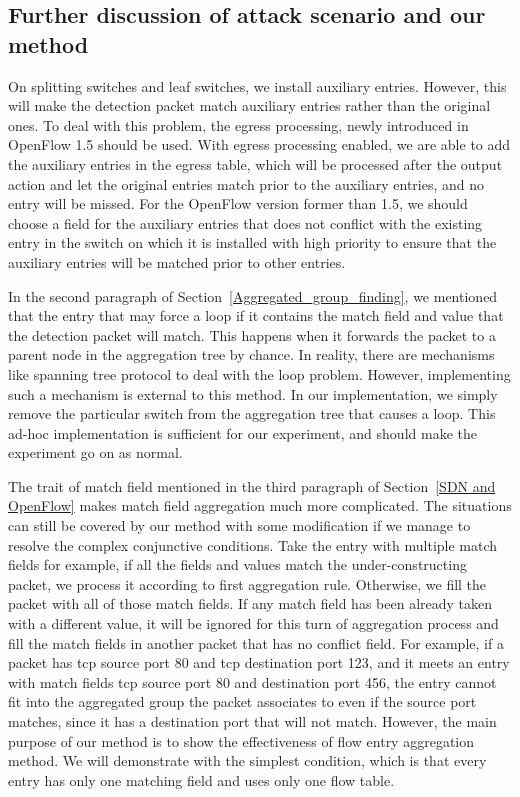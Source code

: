 \subsection{Further discussion of attack scenario and our method}
\label{Further_discussion}
On splitting switches and leaf switches, we install auxiliary entries. However, this will make the detection packet match auxiliary entries rather than the original ones. To deal with this problem, the egress processing, newly introduced in OpenFlow 1.5 \cite{OF_SPEC_15} should be used. With egress processing enabled, we are able to add the auxiliary entries in the egress table, which will be processed after the output action and let the original entries match prior to the auxiliary entries, and no entry will be missed. For the OpenFlow version former than 1.5, we should choose a field for the auxiliary entries that does not conflict with the existing entry in the switch on which it is installed with high priority to ensure that the auxiliary entries will be matched prior to other entries.

In the second paragraph of Section~\ref{Aggregated_group_finding}, we mentioned that the entry that may force a loop if it contains the match field and value that the detection packet will match. This happens when it forwards the packet to a parent node in the aggregation tree by chance. In reality, there are mechanisms like spanning tree protocol to deal with the loop problem. However, implementing such a mechanism is external to this method. In our implementation, we simply remove the particular switch from the aggregation tree that causes a loop. This ad-hoc implementation is sufficient for our experiment, and should make the experiment go on as normal.

The trait of match field mentioned in the third paragraph of Section~\ref{SDN and OpenFlow} makes match field aggregation much more complicated. The situations can still be covered by our method with some modification if we manage to resolve the complex conjunctive conditions. Take the entry with multiple match fields for example, if all the fields and values match the under-constructing packet, we process it according to first aggregation rule. Otherwise, we fill the packet with all of those match fields. If any match field has been already taken with a different value, it will be ignored for this turn of aggregation process and fill the match fields in another packet that has no conflict field. For example, if a packet has tcp source port 80 and tcp destination port 123, and it meets an entry with match fields tcp source port 80 and destination port 456, the entry cannot fit into the aggregated group the packet associates to even if the source port matches, since it has a destination port that will not match.\sout{} However, the main purpose of our method is to show the effectiveness of flow entry aggregation method. We will demonstrate with the simplest condition, which is that every entry has only one matching field and uses only one flow table.

